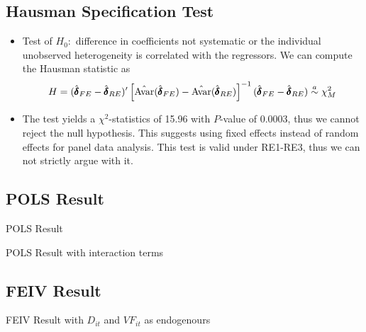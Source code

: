 \documentclass[
11pt,notheorems,compress,hyperref={pdfauthor=Maghfira Ramadhani}
]{beamer}
\begin{document}
\subsection{Hausman Specification Test}
\begin{frame}
\label{hausmanspec}
\begin{itemize}
    \item Test of $H_0:$ difference in coefficients not systematic or the individual unobserved heterogeneity is correlated with the regressors. We can compute the Hausman statistic as \begin{equation*}
        H=(\hat{\pmb{\delta}}_{FE}-\hat{\pmb{\delta}}_{RE})'\left[\hat{\Av}(\hat{\pmb{\delta}}_{FE})-\hat{\Av}(\hat{\pmb{\delta}}_{RE})\right]^{-1}(\hat{\pmb{\delta}}_{FE}-\hat{\pmb{\delta}}_{RE}) \asym \chi_M^2 \end{equation*}
    \item The test yields a $\chi^2$-statistics of 15.96 with $P$-value of 0.0003, thus we cannot reject the null hypothesis. This suggests using fixed effects instead of random effects for panel data analysis. This test is valid under RE1-RE3, thus we can not strictly argue with it.\hyperlink{hausmanclick}{}
\end{itemize}
\end{frame}

\subsection{POLS Result}
\begin{frame}
\label{POLS}
    \begin{table}[h]
    \caption{POLS Result \hyperlink{POLSclick}{}}
    \scalebox{0.8}{}    
    \end{table}
\end{frame}

\begin{frame}
\label{POLS1}
    \begin{table}[h]
    \caption{POLS Result with interaction terms \hyperlink{POLSclick}{}}
    \scalebox{0.8}{}    
    \end{table}
\end{frame}

\subsection{FEIV Result}
\begin{frame}
\label{FEIV}
    \begin{table}[h]
    \caption{FEIV Result with $D_{it}$ and $VF_{it}$ as endogenours \hyperlink{FEIVclick}{}}
    \scalebox{0.8}{}    
    \end{table}
\end{frame}
\end{document}
